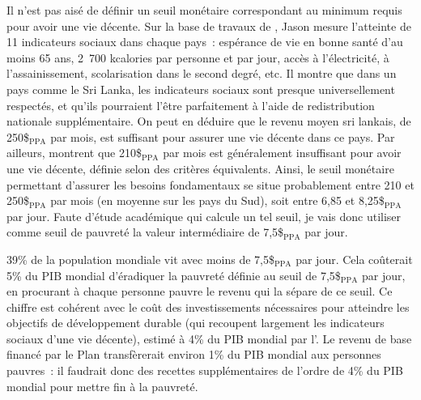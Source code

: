 \documentclass[a5paper,french]{memoir}
\begin{document}
Il n'est pas aisé %
de définir un seuil monétaire correspondant au minimum requis pour avoir une vie décente. Sur la base de travaux de \cite{oneill_good_2018}, Jason \cite{hickel_is_2019} mesure l'atteinte de 11 indicateurs sociaux dans chaque pays~: espérance de vie en bonne santé d'au moins 65 ans, 2~700 kcalories par personne et par jour, accès à l'électricité, à l'assainissement, scolarisation dans le second degré, etc. Il montre que dans un pays comme le Sri Lanka, les indicateurs sociaux sont presque universellement respectés, et qu'ils pourraient l'être parfaitement à l'aide de redistribution nationale supplémentaire. On peut en déduire que le revenu moyen sri lankais, de 250\$$_\text{PPA}$ par mois, est suffisant pour assurer une vie décente dans ce pays. Par ailleurs, \cite{kikstra_decent_2021} montrent que 210\$$_\text{PPA}$ par mois %
est généralement insuffisant pour avoir une vie décente, définie selon des critères équivalents. Ainsi, le seuil monétaire permettant d'assurer les besoins fondamentaux se situe probablement entre 210 et 250\$$_\text{PPA}$ par mois (en moyenne sur les pays du Sud), soit entre 6,85 et 8,25\$$_\text{PPA}$ par jour. Faute d'étude académique qui calcule un tel seuil, je vais donc utiliser comme seuil de pauvreté la valeur intermédiaire de 7,5\$$_\text{PPA}$ par jour. 

39\% de la population mondiale vit avec moins de 7,5\$$_\text{PPA}$ par jour. Cela coûterait 5\% du PIB mondial d'éradiquer la pauvreté définie au seuil de 7,5\$$_\text{PPA}$ par jour, en procurant à chaque personne pauvre le revenu qui la sépare de ce seuil. Ce chiffre est cohérent avec le coût des investissements nécessaires pour atteindre les objectifs de développement durable (qui recoupent largement les indicateurs sociaux d'une vie décente), estimé à 4\% du PIB mondial par l'\cite{unctad_world_2023}. Le revenu de base financé par le Plan transfèrerait environ 1\% du PIB mondial aux personnes pauvres~: il faudrait donc des recettes supplémentaires de l'ordre de 4\% du PIB mondial pour mettre fin à la pauvreté. %
\end{document}
